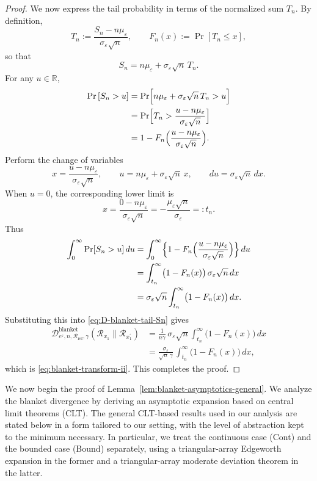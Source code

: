 \documentclass{article}
\theoremstyle{plain}
\theoremstyle{definition}
\begin{document}
\begin{proof}
We now express the tail probability in terms of the normalized sum $T_n$.
By definition,
\[
  T_n
  := \frac{S_n - n\mu_\varepsilon}{\sigma_\varepsilon\sqrt{n}},
  \qquad
  F_n(x) := \Pr\left[T_n\le x\right],
\]
so that
\[
  S_n = n\mu_\varepsilon + \sigma_\varepsilon\sqrt n\,T_n.
\]
For any $u\in\mathbb R$,
\[
\begin{aligned}
  \Pr\left[S_n>u\right]
  &= \Pr\Bigl[
       n\mu_\varepsilon + \sigma_\varepsilon\sqrt n\,T_n
       > u
     \Bigr] \\
  &= \Pr\Bigl[
       T_n
       >
       \frac{u - n\mu_\varepsilon}{\sigma_\varepsilon\sqrt n}
     \Bigr] \\
  &= 1 - F_n\Bigl(
       \frac{u - n\mu_\varepsilon}{\sigma_\varepsilon\sqrt n}
     \Bigr).
\end{aligned}
\]
Perform the change of variables
\[
  x = \frac{u - n\mu_\varepsilon}{\sigma_\varepsilon\sqrt n},
  \qquad
  u = n\mu_\varepsilon + \sigma_\varepsilon\sqrt n\,x,
  \qquad
  du = \sigma_\varepsilon\sqrt n\,dx.
\]
When $u=0$, the corresponding lower limit is
\[
  x = \frac{0 - n\mu_\varepsilon}{\sigma_\varepsilon\sqrt n}
    = -\frac{\mu_\varepsilon\sqrt n}{\sigma_\varepsilon}
    =: t_n.
\]
Thus
\[
\begin{aligned}
  \int_0^\infty \Pr[S_n>u]\,du
  &= \int_0^\infty
       \Bigl\{
         1 - F_n\Bigl(
               \frac{u - n\mu_\varepsilon}{\sigma_\varepsilon\sqrt n}
             \Bigr)
       \Bigr\}\,du \\
  &= \int_{t_n}^\infty
       \bigl(1 - F_n(x)\bigr)\,
       \sigma_\varepsilon\sqrt n\,dx \\
  &= \sigma_\varepsilon\sqrt n
     \int_{t_n}^\infty
       \bigl(1 - F_n(x)\bigr)\,dx.
\end{aligned}
\]
Substituting this into \eqref{eq:D-blanket-tail-Sn} gives
\[
\begin{aligned}
  \mathcal D^{\mathrm{blanket}}_{e^{\varepsilon},n,\mathcal R_{\mathrm{ref}},\gamma}(
    \mathcal{R}_{x_1} \| \mathcal{R}_{x_1^\prime})
  &= \frac{1}{n\gamma}\,
     \sigma_\varepsilon\sqrt n
     \int_{t_n}^\infty
       \bigl(1 - F_n(x)\bigr)\,dx \\
  &= \frac{\sigma_\varepsilon}{\sqrt n\,\gamma}\,
     \int_{t_n}^\infty
       \bigl(1 - F_n(x)\bigr)\,dx,
\end{aligned}
\]
which is \eqref{eq:blanket-transform-ii}. This completes the proof.
\end{proof}

We now begin the proof of Lemma~\ref{lem:blanket-asymptotics-general}.
We analyze the blanket divergence by deriving an asymptotic expansion based on central limit theorems (CLT). The general CLT-based results used in our analysis are stated below in a form tailored to our setting, with the level of abstraction
kept to the minimum necessary. In particular, we treat the continuous case
\textup{(Cont)} and the bounded case \textup{(Bound)} separately, using
a triangular-array Edgeworth expansion in the former and a triangular-array
moderate deviation theorem in the latter.
\end{document}
